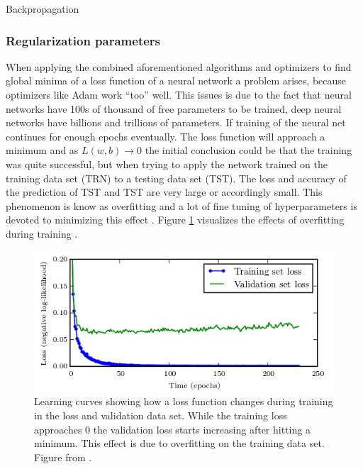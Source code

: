 Backpropagation \cite{rumelhart1988learning}

\subsubsection{Regularization parameters}

When applying the combined aforementioned algorithms and optimizers to find global minima of a loss function
of a neural network a problem arises, because optimizers like Adam work ``too'' well. This issues is due to
the fact that neural networks have 100s of thousand of free parameters to be trained, deep neural networks
have billions and trillions of parameters. If training of the neural net continues for enough epochs
eventually. The loss function will approach a minimum and as $ L(w,b)\rightarrow 0 $ the initial conclusion
could be that the training was quite successful, but when trying to apply the network trained on the training
data set (TRN) to a testing data set (TST). The loss and accuracy of the prediction of TST and TST are very
large or accordingly small. This phenomenon is know as overfitting and a lot of fine tuning of hyperparameters
is devoted to minimizing this effect \cite{tetko1995neural}. Figure \ref{fig:overfitting} visualizes the
effects of overfitting during training \cite{goodfellow2016deep}.

\begin{figure}[H]
   \centering \includegraphics[height=.35\textheight, width=1.1\textwidth]{Figures/overfitting} \decoRule
   \caption[Training vs. validation loss over time]{Learning curves showing how a loss function changes during training
     in the loss and validation data set. While the training loss approaches 0 the validation loss starts increasing
     after hitting a minimum. This effect is due to overfitting on the training data set. Figure from
     \cite{goodfellow2016deep}.}
 \label{fig:overfitting}
\end{figure}

